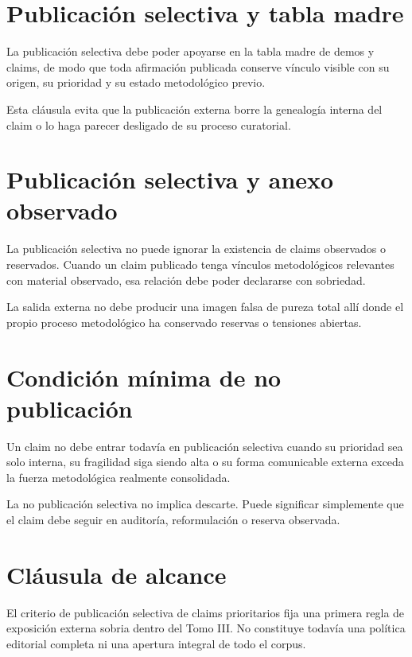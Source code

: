 \section{Publicación selectiva y tabla madre}
\begin{definition}
La publicación selectiva debe poder apoyarse en la tabla madre de demos y claims, de modo que toda afirmación publicada conserve vínculo visible con su origen, su prioridad y su estado metodológico previo.
\end{definition}

\begin{observation}
Esta cláusula evita que la publicación externa borre la genealogía interna del claim o lo haga parecer desligado de su proceso curatorial.
\end{observation}

\section{Publicación selectiva y anexo observado}
\begin{definition}
La publicación selectiva no puede ignorar la existencia de claims observados o reservados. Cuando un claim publicado tenga vínculos metodológicos relevantes con material observado, esa relación debe poder declararse con sobriedad.
\end{definition}

\begin{observation}
La salida externa no debe producir una imagen falsa de pureza total allí donde el propio proceso metodológico ha conservado reservas o tensiones abiertas.
\end{observation}

\section{Condición mínima de no publicación}
\begin{definition}
Un claim no debe entrar todavía en publicación selectiva cuando su prioridad sea solo interna, su fragilidad siga siendo alta o su forma comunicable externa exceda la fuerza metodológica realmente consolidada.
\end{definition}

\begin{observation}
La no publicación selectiva no implica descarte. Puede significar simplemente que el claim debe seguir en auditoría, reformulación o reserva observada.
\end{observation}

\section{Cláusula de alcance}
\begin{observation}
El criterio de publicación selectiva de claims prioritarios fija una primera regla de exposición externa sobria dentro del Tomo III. No constituye todavía una política editorial completa ni una apertura integral de todo el corpus.
\end{observation}

